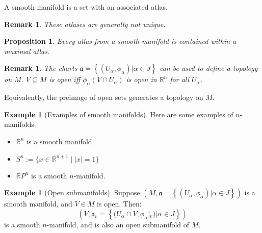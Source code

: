 \documentclass{article}
\newtheorem{proposition}[theorem]{Proposition}
\newtheorem{remark}[theorem]{Remark}
\theoremstyle{definition}
\newtheorem{example}[theorem]{Example}
\numberwithin{theorem}{section}
\numberwithin{equation}{section}
\begin{document}
A smooth manifold is a set with an associated atlas.
\begin{remark}
	These atlases are generally not unique.
\end{remark}

\begin{proposition}
	Every atlas from a smooth manifold is contained within a maximal atlas.
\end{proposition}

\begin{remark}
	The charts $\mathfrak{a} = \left\{ (U_{\alpha}, \phi_\alpha) | \alpha \in J \right\}$ can be used to define a topology on $M$. $V \subseteq M$ is open iff $\phi_\alpha(V \cap U_\alpha)$ is open in $\mathbb{R}^n$ for all $U_\alpha$. 
\end{remark}
Equivalently, the preimage of open sets generates a topology on $M$. 

\begin{example}[Examples of smooth manifolds]
	Here are some examples of $n$-manifolds. 
	\begin{itemize}
		\item $\mathbb{R}^n$ is a smooth manifold. 
		\item $S^n := \{x \in \mathbb{R}^{n + 1} \mid |x| = 1\}$
		\item $\mathbb{R}P^n$ is a smooth $n$-manifold. 
	\end{itemize}
\end{example}

\begin{example}[Open submanifolds]
	Suppose $(M, \mathfrak{a} = \left\{ (U_{\alpha}, \phi_\alpha) | \alpha \in J \right\} )$ is a smooth manifold, and $V \in M$ is open. Then:
	\begin{equation}
		\left(V, \mathfrak{a}_v = \left\{ (U_{\alpha} \cap V, \phi_\alpha|_v) | \alpha \in J \right\} \right)
	\end{equation}
	is a smooth $n$-manifold, and is also an open submanifold of $M$. 
\end{example}
\end{document}
